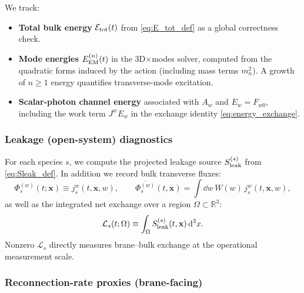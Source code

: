\documentclass[11pt]{article}
\newcommand{\R}{\mathbb{R}}
\newcommand{\x}{\mathbf{x}}     %
\newcommand{\W}{W}              %
\newcommand{\Proj}[1]{\overline{#1}} %
\newcommand{\Sleak}{S_{\rm leak}}
\begin{document}
We track:
\begin{itemize}[leftmargin=1.7em]
\item \textbf{Total bulk energy} \(\mathcal{E}_{\rm tot}(t)\) from
\eqref{eq:E_tot_def} as a global correctness check.
\item \textbf{Mode energies} \(E_{\rm EM}^{(n)}(t)\) in the 3D\(\times\)modes solver,
computed from the quadratic forms induced by the action (including mass terms
\(m_n^2\)). A growth of \(n\ge 1\) energy quantifies transverse-mode excitation.
\item \textbf{Scalar-photon channel energy} associated with \(A_w\) and \(E_w=F_{w0}\),
including the work term \(J^w E_w\) in the exchange identity \eqref{eq:energy_exchange}.
\end{itemize}

\subsubsection*{Leakage (open-system) diagnostics}

For each species \(s\), we compute the projected leakage source \(\Sleak^{(s)}\)
from \eqref{eq:Sleak_def}. In addition we record bulk transverse fluxes:
\begin{equation}
\Phi_{s}^{(w)}(t;\x) \equiv j_s^w(t,\x,w),
\qquad
\Proj{\Phi_{s}^{(w)}}(t,\x)=\int \dd w\,\W(w)\,j_s^w(t,\x,w),
\end{equation}
as well as the integrated net exchange over a region \(\Omega\subset\R^3\):
\begin{equation}
\mathcal{L}_s(t;\Omega) \equiv \int_{\Omega}\Sleak^{(s)}(t,\x)\,\dd^3x.
\end{equation}
Nonzero \(\mathcal{L}_s\) directly measures brane--bulk exchange at the operational
measurement scale.

\subsubsection*{Reconnection-rate proxies (brane-facing)}
\end{document}
